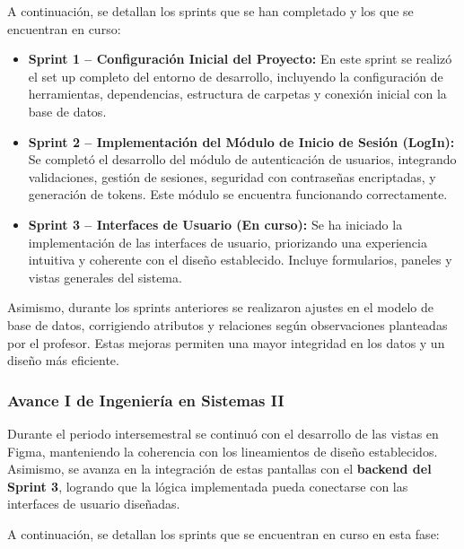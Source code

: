 A continuación, se detallan los sprints que se han completado y los que se encuentran en curso:

\begin{itemize}
	\item \textbf{Sprint 1 – Configuración Inicial del Proyecto:}
	      En este sprint se realizó el set up completo del entorno de desarrollo, incluyendo la configuración de herramientas, dependencias, estructura de carpetas y conexión inicial con la base de datos.

	\item \textbf{Sprint 2 – Implementación del Módulo de Inicio de Sesión (LogIn):}
	      Se completó el desarrollo del módulo de autenticación de usuarios, integrando validaciones, gestión de sesiones, seguridad con contraseñas encriptadas, y generación de tokens. Este módulo se encuentra funcionando correctamente.

	\item \textbf{Sprint 3 – Interfaces de Usuario (En curso):}
	      Se ha iniciado la implementación de las interfaces de usuario, priorizando una experiencia intuitiva y coherente con el diseño establecido. Incluye formularios, paneles y vistas generales del sistema.
\end{itemize}

Asimismo, durante los sprints anteriores se realizaron ajustes en el modelo de base de datos, corrigiendo atributos y relaciones según observaciones planteadas por el profesor. Estas mejoras permiten una mayor integridad en los datos y un diseño más eficiente.

\subsubsection{Avance I de Ingeniería en Sistemas II}

Durante el periodo intersemestral se continuó con el desarrollo de las vistas en Figma, manteniendo la coherencia con los lineamientos de diseño establecidos. Asimismo, se avanza en la integración de estas pantallas con el \textbf{backend del Sprint 3}, logrando que la lógica implementada pueda conectarse con las interfaces de usuario diseñadas.

A continuación, se detallan los sprints que se encuentran en curso en esta fase:

